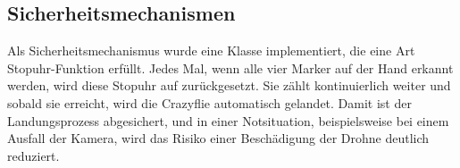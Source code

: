 \subsection{Sicherheitsmechanismen}
Als Sicherheitsmechanismus wurde eine Klasse implementiert, die eine Art Stopuhr-Funktion erfüllt.
Jedes Mal, wenn alle vier Marker auf der Hand erkannt werden, wird diese Stopuhr auf  zurückgesetzt.
Sie zählt kontinuierlich weiter und sobald sie  erreicht, wird die Crazyflie automatisch gelandet.
Damit ist der Landungsprozess abgesichert, und in einer Notsituation, beispielsweise bei einem Ausfall der Kamera, wird das Risiko einer Beschädigung der Drohne deutlich reduziert.


\endgroup